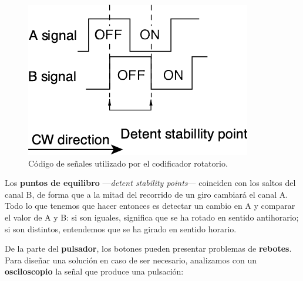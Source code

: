 \begin{figure}[H]
	\noindent \begin{centering}
		\includegraphics[width=\linewidth/3]{capitulo3/rotary}
		\par\end{centering}
	\smallskip
	\caption{\label{fig:rotary} Código de señales utilizado por el codificador rotatorio.}
\end{figure} 

\smallskip

Los \textbf{puntos de equilibro} ---\textit{detent stability points}--- coinciden con los saltos del canal B, de forma que a la mitad del recorrido de un giro cambiará el canal A. Todo lo que tenemos que hacer entonces es detectar un cambio en A y comparar el valor de A y B: si son iguales, significa que se ha rotado en sentido antihorario; si son distintos, entendemos que se ha girado en sentido horario.

De la parte del \textbf{pulsador}, los botones pueden presentar problemas de \textbf{rebotes}. Para diseñar una solución en caso de ser necesario, analizamos con un \textbf{osciloscopio} la señal que produce una pulsación:

\smallskip

